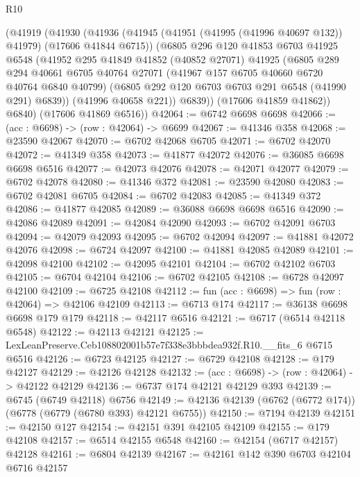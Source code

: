 \begin{lexlean}{R10}
\begin{coremodule}
      (@41919
        (@41930
          (@41936
            (@41945 (@41951 (@41995 (@41996 @40697 @132)) @41979) (@17606 @41844 @6715))
            (@6805
              @296
              @120
              @41853
              @6703
              @41925
              @6548
              (@41952
                @295
                @41849
                @41852
                (@40852 @27071)
                @41925
                (@6805
                  @289
                  @294
                  @40661
                  @6705
                  @40764
                  @27071
                  (@41967 @157 @6705 @40660 @6720 @40764 @6840 @40799)
                  (@6805 @292 @120 @6703 @6703 @291 @6548 (@41990 @291) @6839))
                (@41996 @40658 @221))
              @6839))
          (@17606 @41859 @41862))
        @6840)
      (@17606 @41869 @6516))
@42064 := @6742 @6698 @6698
@42066 := (acc : @6698) -> (row : @42064) -> @6699
@42067 := @41346 @358
@42068 := @23590 @42067
@42070 := @6702 @42068 @6705
@42071 := @6702 @42070
@42072 := @41349 @358
@42073 := @41877 @42072
@42076 := @36085 @6698 @6698 @6516
@42077 := @42073 @42076
@42078 := @42071 @42077
@42079 := @6702 @42078
@42080 := @41346 @372
@42081 := @23590 @42080
@42083 := @6702 @42081 @6705
@42084 := @6702 @42083
@42085 := @41349 @372
@42086 := @41877 @42085
@42089 := @36088 @6698 @6698 @6516
@42090 := @42086 @42089
@42091 := @42084 @42090
@42093 := @6702 @42091 @6703
@42094 := @42079 @42093
@42095 := @6702 @42094
@42097 := @41881 @42072 @42076
@42098 := @6724 @42097
@42100 := @41881 @42085 @42089
@42101 := @42098 @42100
@42102 := @42095 @42101
@42104 := @6702 @42102 @6703
@42105 := @6704 @42104
@42106 := @6702 @42105
@42108 := @6728 @42097 @42100
@42109 := @6725 @42108
@42112 := fun (acc : @6698) => fun (row : @42064) => @42106 @42109
@42113 := @6713 @174
@42117 := @36138 @6698 @6698 @179 @179
@42118 := @42117 @6516
@42121 := @6717 (@6514 @42118 @6548)
@42122 := @42113 @42121
@42125 := LexLeanPreserve.Ceb108802001b57e7f338e3bbbdea932f.R10.__fits_6 @6715 @6516
@42126 := @6723 @42125
@42127 := @6729 @42108
@42128 := @179 @42127
@42129 := @42126 @42128
@42132 := (acc : @6698) -> (row : @42064) -> @42122 @42129
@42136 := @6737 @174 @42121 @42129 @393
@42139 := @6745 (@6749 @42118) @6756
@42149 := @42136 @42139 (@6762 (@6772 @174)) (@6778 (@6779 (@6780 @393) @42121 @6755))
@42150 := @7194 @42139
@42151 := @42150 @127
@42154 := @42151 @391 @42105 @42109
@42155 := @179 @42108
@42157 := @6514 @42155 @6548
@42160 := @42154 (@6717 @42157) @42128
@42161 := @6804 @42139
@42167 := @42161 @142 @390 @6703 @42104 @6716 @42157

\end{coremodule}
\end{lexlean}
